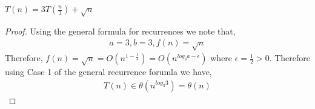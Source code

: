 \documentclass[12pt]{article}
\newenvironment{question}[2][Question]{\begin{trivlist}
\item[\hskip \labelsep {\bfseries #1}\hskip \labelsep {\bfseries #2.}]}{\end{trivlist}}
\begin{document}
\begin{question}{5 (b)} $T(n) = 3T(\frac{n}{3}) + \sqrt{n}$
  \leavevmode \\
  \begin{proof}
    Using the general formula for recurrences we note that,
    \begin{align*}
      a = 3, b = 3, f(n) = \sqrt{n}
    \end{align*}
    Therefore, $f(n) = \sqrt{n} = O(n^{1 - \frac{1}{2}}) = O(n^{log_{b}a - \epsilon})$
    where $\epsilon = \frac{1}{2} > 0$.
    Therefore using Case 1 of the general recurrence forumla we have,
    \begin{align*}
      T(n) \in \theta(n^{log_{3}3}) = \theta(n)
    \end{align*}
  \end{proof}
\end{question}
\end{document}
